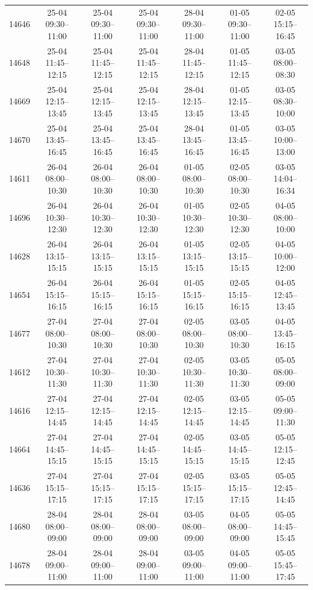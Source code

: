 \begin{table}[htbp]
\begin{tabular}{|r|c|c|c|c|c|c|}
14646 & 25-04 09:30--11:00 & 25-04 09:30--11:00 & 25-04 09:30--11:00 & 28-04 09:30--11:00 & 01-05 09:30--11:00 & 02-05 15:15--16:45 \\ 
14648 & 25-04 11:45--12:15 & 25-04 11:45--12:15 & 25-04 11:45--12:15 & 28-04 11:45--12:15 & 01-05 11:45--12:15 & 03-05 08:00--08:30 \\ 
14669 & 25-04 12:15--13:45 & 25-04 12:15--13:45 & 25-04 12:15--13:45 & 28-04 12:15--13:45 & 01-05 12:15--13:45 & 03-05 08:30--10:00 \\ 
14670 & 25-04 13:45--16:45 & 25-04 13:45--16:45 & 25-04 13:45--16:45 & 28-04 13:45--16:45 & 01-05 13:45--16:45 & 03-05 10:00--13:00 \\ 
14611 & 26-04 08:00--10:30 & 26-04 08:00--10:30 & 26-04 08:00--10:30 & 01-05 08:00--10:30 & 02-05 08:00--10:30 & 03-05 14:04--16:34 \\ 
14696 & 26-04 10:30--12:30 & 26-04 10:30--12:30 & 26-04 10:30--12:30 & 01-05 10:30--12:30 & 02-05 10:30--12:30 & 04-05 08:00--10:00 \\ 
14628 & 26-04 13:15--15:15 & 26-04 13:15--15:15 & 26-04 13:15--15:15 & 01-05 13:15--15:15 & 02-05 13:15--15:15 & 04-05 10:00--12:00 \\ 
14654 & 26-04 15:15--16:15 & 26-04 15:15--16:15 & 26-04 15:15--16:15 & 01-05 15:15--16:15 & 02-05 15:15--16:15 & 04-05 12:45--13:45 \\ 
14677 & 27-04 08:00--10:30 & 27-04 08:00--10:30 & 27-04 08:00--10:30 & 02-05 08:00--10:30 & 03-05 08:00--10:30 & 04-05 13:45--16:15 \\ 
14612 & 27-04 10:30--11:30 & 27-04 10:30--11:30 & 27-04 10:30--11:30 & 02-05 10:30--11:30 & 03-05 10:30--11:30 & 05-05 08:00--09:00 \\ 
14616 & 27-04 12:15--14:45 & 27-04 12:15--14:45 & 27-04 12:15--14:45 & 02-05 12:15--14:45 & 03-05 12:15--14:45 & 05-05 09:00--11:30 \\ 
14664 & 27-04 14:45--15:15 & 27-04 14:45--15:15 & 27-04 14:45--15:15 & 02-05 14:45--15:15 & 03-05 14:45--15:15 & 05-05 12:15--12:45 \\ 
14636 & 27-04 15:15--17:15 & 27-04 15:15--17:15 & 27-04 15:15--17:15 & 02-05 15:15--17:15 & 03-05 15:15--17:15 & 05-05 12:45--14:45 \\ 
14680 & 28-04 08:00--09:00 & 28-04 08:00--09:00 & 28-04 08:00--09:00 & 03-05 08:00--09:00 & 04-05 08:00--09:00 & 05-05 14:45--15:45 \\ 
14678 & 28-04 09:00--11:00 & 28-04 09:00--11:00 & 28-04 09:00--11:00 & 03-05 09:00--11:00 & 04-05 09:00--11:00 & 05-05 15:45--17:45 \\ 

\end{tabular}
\end{table}
